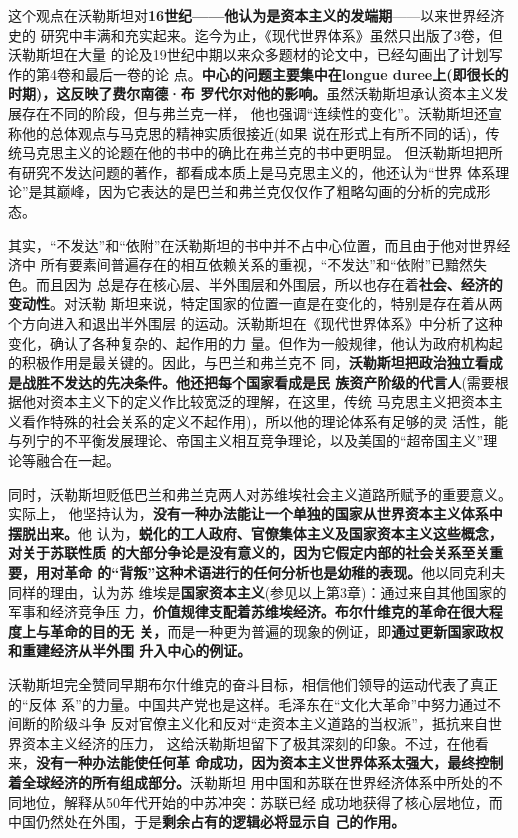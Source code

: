 这个观点在沃勒斯坦对\textbf{16世纪——他认为是资本主义的发端期}——以来世界经济史的
研究中丰满和充实起来。迄今为止，《现代世界体系》虽然只出版了3卷，但沃勒斯坦在大量
的论及19世纪中期以来众多题材的论文中，已经勾画出了计划写作的第4卷和最后一卷的论
点。\textbf{中心的问题主要集中在longue duree上(即很长的时期)，这反映了费尔南德·布
  罗代尔对他的影响。}虽然沃勒斯坦承认资本主义发展存在不同的阶段，但与弗兰克一样，
他也强调“连续性的变化”。沃勒斯坦还宣称他的总体观点与马克思的精神实质很接近(如果
说在形式上有所不同的话)，传统马克思主义的论题在他的书中的确比在弗兰克的书中更明显。
但沃勒斯坦把所有研究不发达问题的著作，都看成本质上是马克思主义的，他还认为“世界
体系理论”是其巅峰，因为它表达的是巴兰和弗兰克仅仅作了粗略勾画的分析的完成形态。

其实，“不发达”和“依附”在沃勒斯坦的书中并不占中心位置，而且由于他对世界经济中
所有要素间普遍存在的相互依赖关系的重视，“不发达”和“依附”已黯然失色。而且因为
总是存在核心层、半外围层和外围层，所以也存在着\textbf{社会、经济的变动性}。对沃勒
斯坦来说，特定国家的位置一直是在变化的，特别是存在着从两个方向进入和退出半外围层
的运动。沃勒斯坦在《现代世界体系》中分析了这种变化，确认了各种复杂的、起作用的力
量。但作为一般规律，他认为政府机构起的积极作用是最关键的。因此，与巴兰和弗兰克不
同，\textbf{沃勒斯坦把政治独立看成是战胜不发达的先决条件。他还把每个国家看成是民
  族资产阶级的代言人}(需要根据他对资本主义下的定义作比较宽泛的理解，在这里，传统
马克思主义把资本主义看作特殊的社会关系的定义不起作用)，所以他的理论体系有足够的灵
活性，能与列宁的不平衡发展理论、帝国主义相互竞争理论，以及美国的“超帝国主义”理
论等融合在一起。

同时，沃勒斯坦贬低巴兰和弗兰克两人对苏维埃社会主义道路所赋予的重要意义。实际上，
他坚持认为，\textbf{没有一种办法能让一个单独的国家从世界资本主义体系中摆脱出来。}他
认为，\textbf{蜕化的工人政府、官僚集体主义及国家资本主义这些概念，对关于苏联性质
  的大部分争论是没有意义的，因为它假定内部的社会关系至关重要，用对革命
  的“背叛”这种术语进行的任何分析也是幼稚的表现。}他以同克利夫同样的理由，认为苏
维埃是\textbf{国家资本主义}(参见以上第3章)：通过来自其他国家的军事和经济竞争压
力，\textbf{价值规律支配着苏维埃经济。布尔什维克的革命在很大程度上与革命的目的无
  关，}而是一种更为普遍的现象的例证，即\textbf{通过更新国家政权和重建经济从半外围
  升入中心的例证。}

沃勒斯坦完全赞同早期布尔什维克的奋斗目标，相信他们领导的运动代表了真正的“反体
系”的力量。中国共产党也是这样。毛泽东在“文化大革命”中努力通过不间断的阶级斗争
反对官僚主义化和反对“走资本主义道路的当权派”，抵抗来自世界资本主义经济的压力，
这给沃勒斯坦留下了极其深刻的印象。不过，在他看来，\textbf{没有一种办法能使任何革
  命成功，因为资本主义世界体系太强大，最终控制着全球经济的所有组成部分。}沃勒斯坦
用中国和苏联在世界经济体系中所处的不同地位，解释从50年代开始的中苏冲突：苏联已经
成功地获得了核心层地位，而中国仍然处在外围，于是\textbf{剩余占有的逻辑必将显示自
  己的作用。}

